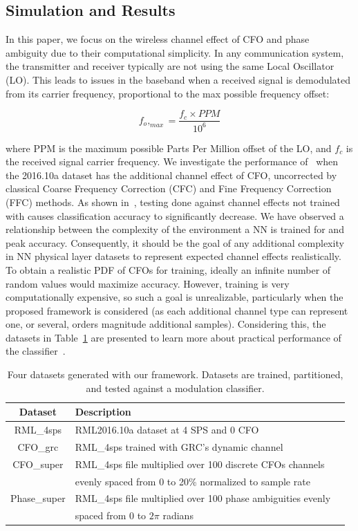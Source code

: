\subsection{Simulation and Results}
\label{sec4}

In this paper, we focus on the wireless channel effect of CFO and phase ambiguity due to their computational simplicity. In any communication system, the transmitter and receiver typically are not using the same Local Oscillator (LO). This leads to issues in the baseband when a received signal is demodulated from its carrier frequency, proportional to the max possible frequency offset:

\begin{equation}
\label{eq3}
f_o,_{max} = \frac{f_c \times PPM}{10^6}
\end{equation}

\noindent where PPM is the maximum possible Parts Per Million offset of the LO, and $f_c$ is the received signal carrier frequency. We investigate the performance of~\cite{o2016convolutional} when the 2016.10a dataset has the additional channel effect of CFO, uncorrected by classical Coarse Frequency Correction (CFC) and Fine Frequency Correction (FFC) methods. As shown in~\cite{8170853}, testing done against channel effects not trained with causes classification accuracy to significantly decrease. We have observed a relationship between the complexity of the environment a NN is trained for and peak accuracy. Consequently, it should be the goal of any additional complexity in NN physical layer datasets to represent expected channel effects realistically. To obtain a realistic PDF of CFOs for training, ideally an infinite number of random values would maximize accuracy. However, training is very computationally expensive, so such a goal is unrealizable, particularly when the proposed framework is considered (as each additional channel type can represent one, or several, orders magnitude additional samples). Considering this, the datasets in Table~\ref{table:tab2} are presented to learn more about practical performance of the classifier~\cite{o2016convolutional}.

\begin{table}[ht!]
\centering
\caption{Four datasets generated with our framework. Datasets are trained, partitioned, and tested against a modulation classifier.}
\begin{tabular*}{0.5\textwidth}{c l c }
\toprule
Dataset & Description\\\hline
RML\_4sps & RML2016.10a dataset at 4 SPS and 0 CFO\\
CFO\_grc & RML\_4sps trained with GRC's dynamic channel\\
CFO\_super & RML\_4sps file multiplied over 100 discrete CFOs channels\\
 & evenly spaced from 0 to 20\% normalized to sample rate\\
Phase\_super & RML\_4sps file multiplied over 100 phase ambiguities evenly\\
 & spaced from 0 to $2\pi$ radians\\
\bottomrule
\end{tabular*}
\label{table:tab2}
\end{table}

